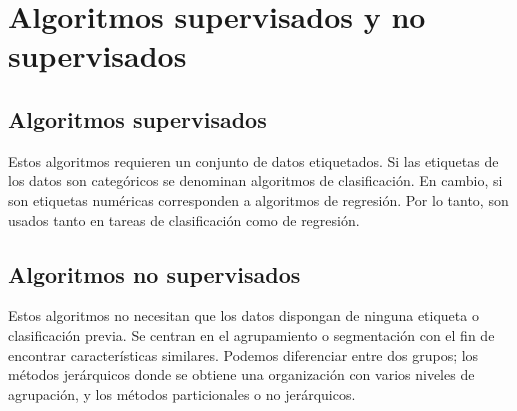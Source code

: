 \section{Algoritmos supervisados y no supervisados}

\subsection{Algoritmos supervisados}
Estos algoritmos requieren un conjunto de datos etiquetados. Si las etiquetas de los datos son categóricos se denominan algoritmos de clasificación. En cambio, si son etiquetas numéricas corresponden a algoritmos de regresión. Por lo tanto, son usados tanto en tareas de clasificación como de regresión.

\subsection{Algoritmos no supervisados}
Estos algoritmos no necesitan que los datos dispongan de ninguna etiqueta o clasificación previa. Se centran en el agrupamiento o segmentación con el fin de encontrar características  similares. Podemos diferenciar entre  dos grupos; los métodos jerárquicos donde se obtiene una organización con varios niveles de agrupación, y los métodos particionales o no jerárquicos.
